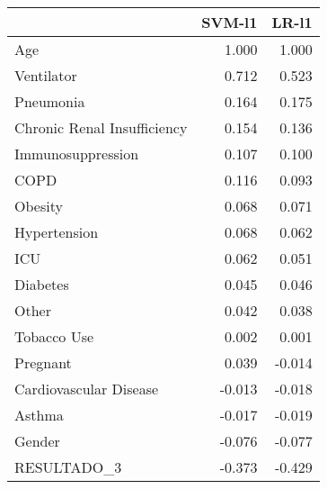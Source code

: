 \begin{tabular}{lrr}
\toprule
{} &  SVM-l1 &  LR-l1 \\
\midrule
Age                         &   1.000 &  1.000 \\
Ventilator                  &   0.712 &  0.523 \\
Pneumonia                   &   0.164 &  0.175 \\
Chronic Renal Insufficiency &   0.154 &  0.136 \\
Immunosuppression           &   0.107 &  0.100 \\
COPD                        &   0.116 &  0.093 \\
Obesity                     &   0.068 &  0.071 \\
Hypertension                &   0.068 &  0.062 \\
ICU                         &   0.062 &  0.051 \\
Diabetes                    &   0.045 &  0.046 \\
Other                       &   0.042 &  0.038 \\
Tobacco Use                 &   0.002 &  0.001 \\
Pregnant                    &   0.039 & -0.014 \\
Cardiovascular Disease      &  -0.013 & -0.018 \\
Asthma                      &  -0.017 & -0.019 \\
Gender                      &  -0.076 & -0.077 \\
RESULTADO\_3                 &  -0.373 & -0.429 \\
\bottomrule
\end{tabular}
